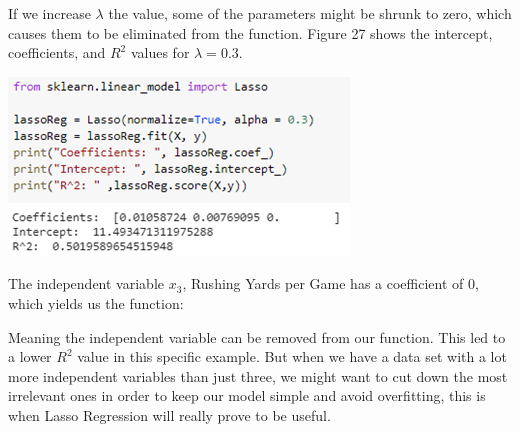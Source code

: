 \documentclass[a4paper,12pt]{report}
\begin{document}
If we increase $\lambda$ the value, some of the parameters might be shrunk to zero, which causes them to be eliminated from the function. Figure 27 shows the intercept, coefficients, and $R^2$ values for $\lambda=0.3$.

\begin{center}
    \captionsetup{type=figure}
    \includegraphics[width=.9\linewidth]{media/LassoCoeff2.png}
\end{center}

The independent variable $x_3$, Rushing Yards per Game has a coefficient of 0, which yields us the function:

Meaning the independent variable  can be removed from our function. This led to a lower $R^2$ value in this specific example. But when we have a data set with a lot more independent variables than just three, we might want to cut down the most irrelevant ones in order to keep our model simple and avoid overfitting, this is when Lasso Regression will really prove to be useful. 
\end{document}
